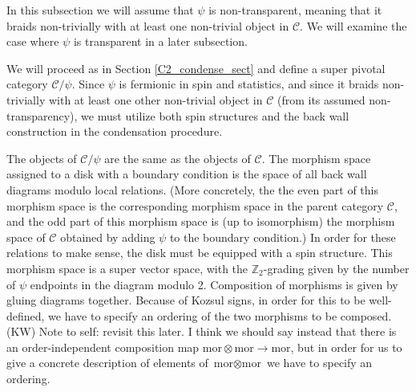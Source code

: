 \documentclass[12pt,a4paper]{article}
\newcommand{\tp}{\otimes}
\newcommand{\mcc}{\mathcal{C}}
\newcommand{\zt}{\mathbb{Z}_2}
\newcommand{\mor}{\text{mor}}
\newcommand{\kw}[1]{{\color{kwcolor}\footnotesize{(KW) #1}}}
\begin{document}
In this subsection we will assume that $\psi$ is non-transparent, meaning that it braids non-trivially with at least one non-trivial object in $\mcc$. 
We will examine the case where $\psi$ is transparent in a later subsection. 


We will proceed 
as in Section \ref{C2_condense_sect} and define a super pivotal category $\mcc/\psi$. 
Since $\psi$ is fermionic in spin and statistics, and since it braids non-trivially with 
at least one other non-trivial object in $\mcc$ (from its assumed non-transparency), we
must utilize both spin structures and the back wall construction in the condensation 
procedure. 

The objects of $\mcc/\psi$ are the same as the objects of $\mcc$.
The morphism space assigned to a disk with a boundary condition is the space of all back wall diagrams
modulo local relations.
(More concretely, the the even part of this morphism space is the corresponding morphism space in the parent category $\mcc$,
and the odd part of this morphism space is (up to isomorphism) the morphism space of $\mcc$ 
obtained by adding $\psi$ to the boundary condition.)
In order for these relations to make sense, the disk must be equipped with a spin structure.
This morphism space is a super vector space, with the $\zt$-grading given by the number of $\psi$ endpoints in the diagram modulo 2.
Composition of morphisms is given by gluing diagrams together.
Because of Kozsul signs, in order for this to be well-defined, 
we have to specify an ordering of the two morphisms to be composed.
\kw{Note to self: revisit this later.
I think we should say instead that there is an order-independent composition map $\mor\tp\mor\to\mor$, but in order
for us to give a concrete description of elements of $\mor\tp\mor$ we have to specify an ordering.}

\medskip
\end{document}
